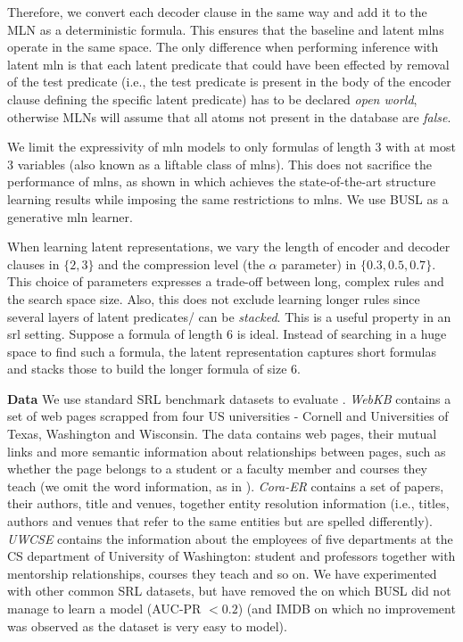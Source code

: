 Therefore, we convert each decoder clause in the same way and add it to the MLN as a deterministic formula.
This ensures that the baseline and latent \gls{mln}s operate in the same space.
The only difference when performing inference with latent \gls{mln} is that each latent predicate that could have been effected by removal of the test predicate (i.e., the test predicate is present in the body of the encoder clause defining the specific latent predicate) has to be declared \textit{open world}, otherwise MLNs will assume that all atoms not present in the database are \textit{false}.


 We limit the expressivity of \gls{mln} models to only formulas of length 3 with at most 3 variables (also known as a liftable class of \gls{mln}s).
This does not sacrifice the performance of \gls{mln}s, as shown in \cite{VanHaaren2016} which achieves the state-of-the-art structure learning results while imposing the same restrictions to \gls{mln}s.
We use BUSL \cite{mihalkova:icml07} as a generative \gls{mln} learner.




When learning latent representations, we vary the length of encoder and decoder clauses in $\{2,3\}$ and the compression level (the $\alpha$ parameter) in $\{0.3, 0.5, 0.7\}$.
This choice of parameters expresses a trade-off between long, complex rules and the search space size.
Also, this does not exclude learning longer rules since several layers of latent predicates/ can be \textit{stacked}.
This is a useful property in an \gls{srl} setting.
Suppose a formula of length 6 is ideal.
Instead of searching in a huge space to find such a formula, the latent representation captures short formulas and stacks those to build the longer formula of size 6.




\textbf{Data}
We use standard SRL benchmark datasets to evaluate .
\textit{WebKB} contains a set of web pages scrapped from four US universities - Cornell and Universities of Texas, Washington and Wisconsin.
The data contains web pages, their mutual links and more semantic information about relationships between pages, such as whether the page belongs to a student or a faculty member and courses they teach (we omit the word information, as in \cite{mihalkova:icml07}).
\textit{Cora-ER} contains a set of papers, their authors, title and venues, together entity resolution information (i.e., titles, authors and venues that refer to the same entities but are spelled differently).
\textit{UWCSE} contains the information about the employees of five departments at the CS department of University of Washington: student and professors together with mentorship relationships, courses they teach and so on.
We have experimented with other common SRL datasets, but have removed the on which BUSL did not manage to learn a model (AUC-PR $< 0.2$) (and IMDB on which no improvement was observed as the dataset is very easy to model).








